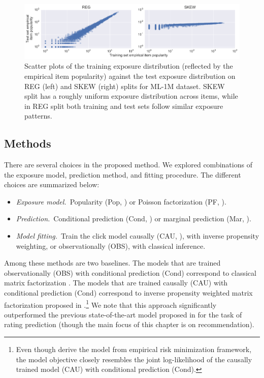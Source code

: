
\begin{figure}[!ht]
  \centering
    \includegraphics[width=\textwidth]{fig/tr_vs_te}
    \caption{Scatter plots of the training exposure distribution
      (reflected by the empirical item popularity) against the test
      exposure distribution on REG (left) and SKEW (right) splits for
      ML-1M dataset. SKEW split has a roughly uniform exposure
      distribution across items, while in REG split both training and
      test sets follow similar exposure patterns. }
   \label{fig:tr_vs_te}
\end{figure}

\subsection{Methods}

There are several choices in the proposed method.  We explored
combinations of the exposure model, prediction method, and fitting
procedure.  The different choices are summarized below:
\begin{itemize}
\item \textit{Exposure model.\,}
  Popularity (Pop, ) or
  Poisson factorization (PF, ).

\item \textit{Prediction.\,} Conditional prediction (Cond, ) or marginal
  prediction (Mar, ).

\item \textit{Model fitting.\,} Train the click model causally (CAU,
  ), with inverse propensity weighting, or
  observationally (OBS), with
  classical inference.
\end{itemize}

Among these methods are two baselines. The models that are trained
observationally (OBS) with conditional prediction (Cond) correspond to
classical matrix factorization \citep{mnih2007probabilistic}. The models that
are trained causally (CAU) with conditional prediction (Cond)
correspond to inverse propensity weighted matrix factorization
proposed in \citet{schnabel16treatment}.\footnote{Even though
  \citet{schnabel16treatment} derive the model from empirical risk
  minimization framework, the model objective closely resembles the
  joint log-likelihood of the causally trained model (CAU) with
  conditional prediction (Cond).} We note that this approach
significantly outperformed the previous state-of-the-art model
proposed in \citet{HernandezLobato14nmar} for the task of rating
prediction (though the main focus of this chapter is on recommendation).

